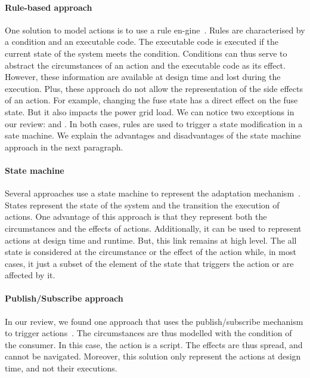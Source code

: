 \paragraph{Rule-based approach}
One solution to model \glspl{action} is to use a rule en-\linebreak gine~\cite{DBLP:conf/icse/TaharaOH17, DBLP:conf/icse/ArcainiRS15, DBLP:conf/wrla/BruniCGLV12, DBLP:conf/eurosys/GraceHPBCT08, DBLP:conf/gpce/PintoFT03, DBLP:journals/computer/GarlanCHSS04}.
Rules are characterised by a condition and an executable code.
The executable code is executed if the current state of the system meets the condition.
Conditions can thus serve to abstract the \Glspl{circumstance} of an action and the executable code as its effect.
However, these information are available at design time and lost during the execution.
Plus, these approach do not allow the representation of the side effects of an action.
For example, changing the fuse state has a direct effect on the fuse state.
But it also impacts the power grid load.
We can notice two exceptions in our review: \cite{DBLP:conf/icse/TaharaOH17} and \cite{DBLP:conf/icse/ArcainiRS15}.
In both cases, rules are used to trigger a state modification in a sate machine.
We explain the advantages and disadvantages of the state machine approach in the next paragraph. 

\paragraph{State machine}
Several approaches use a state machine to represent the adaptation mechanism~\cite{DBLP:conf/icse/ArcainiRS15, DBLP:conf/icse/IftikharW14a, DBLP:conf/smartgridsec/0001FKNT14, DBLP:conf/sigsoft/MorenoCGS15, DBLP:conf/kbse/FilieriGLM11, DBLP:conf/wetice/DjoudiBZ14, DBLP:conf/aosd/ZhangGC09, DBLP:conf/icse/GhezziPST13, DBLP:conf/kbse/TajalliGEM10}.
States represent the state of the system and the transition the execution of \glspl{action}. 
One advantage of this approach is that they represent both the \glspl{circumstance} and the effects of actions.
Additionally, it can be used to represent actions at design time and runtime.
But, this link remains at high level.
The all state is considered at the circumstance or the effect of the action while, in most cases, it just a subset of the element of the state that triggers the action or are affected by it. 

\paragraph{Publish/Subscribe approach}
In our review, we found one approach that uses the publish/subscribe mechanism to trigger \glspl{action}~\cite{DBLP:conf/icse/BarbosaLMJ17}.
The \glspl{circumstance} are thus modelled with the condition of the consumer.
In this case, the action is a script.
The effects are thus spread, and cannot be navigated.
Moreover, this solution only represent the actions at design time, and not their executions.
	
